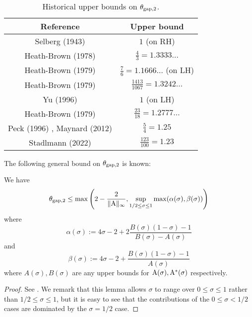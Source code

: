     \begin{table}[ht]
        \caption{Historical upper bounds on $\theta_{\mathrm{gap},2}$.}
        \centering
        \renewcommand{\arraystretch}{1.2}
        \begin{tabular}{|c|c|}
        \hline
        Reference & Upper bound \\
        \hline
        Selberg (1943) \cite{selberg_1943} & $1$ (on RH)\\
        \hline
        Heath-Brown (1978) \cite{heath_brown_consecutive_I} & $\frac{4}{3} = 1.3333\dots$\\
        \hline
        Heath-Brown (1979) \cite{heath_brown_consecutive_II} & $\frac{7}{6} = 1.1666\dots$ (on LH) \\
        \hline
        Heath-Brown (1979) \cite{heath_brown_consecutive_II} & $\frac{1413}{1067} = 1.3242\dots$ \\
        \hline
        Yu (1996) \cite{yu_differences_1996} & $1$ (on LH) \\
        \hline
        Heath-Brown (1979) \cite{heath_brown_consecutive_III} & $\frac{23}{18} = 1.2777\dots$ \\
        \hline
        Peck (1996) \cite{peck_on_1996}, Maynard (2012) \cite{maynard_difference_2012} & $\frac{5}{4} = 1.25$ \\
        \hline
        Stadlmann (2022) \cite{stadlmann_mean_2022} & $\frac{123}{100} = 1.23$ \\
        \hline
    \end{tabular}
    \end{table}\label{gapsquare-table}

The following general bound on $\theta_{\mathrm{gap},2}$ is known:

\begin{proposition}\label{gapsquare-from-a}
    We have
    $$ \theta_{\mathrm{gap},2} \leq \max\left( 2-\frac{2}{\|\mathrm{A}\|_\infty}, \sup_{1/2 \leq \sigma \leq 1} \max(\alpha(\sigma), \beta(\sigma))\right)$$
    where
    $$ \alpha(\sigma) := 4\sigma - 2 + 2 \frac{B(\sigma)(1-\sigma)-1}{B(\sigma)-A(\sigma)}$$
    and
    $$ \beta(\sigma) := 4\sigma - 2 + \frac{B(\sigma)(1-\sigma)-1}{A(\sigma)}$$
    where $A(\sigma), B(\sigma)$ are any upper bounds for $\mathrm{A}(\sigma), \mathrm{A}^*(\sigma)$ respectively.
\end{proposition}

\begin{proof} See \cite[Lemma 2]{heath_brown_consecutive_II}. We remark that this lemma allows $\sigma$ to range over $0 \leq \sigma \leq 1$ rather than $1/2 \leq \sigma \leq 1$, but it is easy to see that the contributions of the $0 \leq \sigma < 1/2$ cases are dominated by the $\sigma=1/2$ case.
\end{proof}

